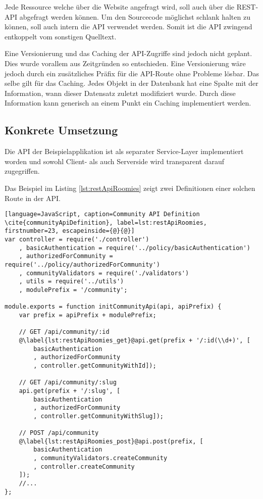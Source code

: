 Jede Ressource welche über die Website angefragt wird, soll auch über die REST-API abgefragt werden können. Um den Sourcecode möglichst schlank halten zu können, soll auch intern die API verwendet werden.
Somit ist die API zwingend entkoppelt vom sonstigen Quelltext.

Eine Versionierung und das Caching der API-Zugriffe sind jedoch nicht geplant. Dies wurde vorallem aus Zeitgründen so entschieden.
Eine Versionierung wäre jedoch durch ein zusätzliches Präfix für die API-Route ohne Probleme lösbar.
Das selbe gilt für das Caching. Jedes Objekt in der Datenbank hat eine Spalte mit der Information, wann dieser Datensatz zuletzt modifiziert wurde. Durch diese Information kann generisch an einem Punkt ein Caching implementiert werden.

\subsection*{Konkrete Umsetzung}
Die API der Beispielapplikation ist als separater Service-Layer implementiert worden und sowohl Client- als auch Serverside wird transparent darauf zugegriffen.

Das Beispiel im Listing \ref{lst:restApiRoomies} zeigt zwei Definitionen einer solchen Route in der API.

\begin{lstlisting}[language=JavaScript, caption=Community API Definition \cite{communityApiDefinition}, label=lst:restApiRoomies, firstnumber=23, escapeinside={@}{@}]
var controller = require('./controller')
	, basicAuthentication = require('../policy/basicAuthentication')
	, authorizedForCommunity = require('../policy/authorizedForCommunity')
	, communityValidators = require('./validators')
	, utils = require('../utils')
	, modulePrefix = '/community';

module.exports = function initCommunityApi(api, apiPrefix) {
	var prefix = apiPrefix + modulePrefix;

	// GET /api/community/:id
	@\label{lst:restApiRoomies_get}@api.get(prefix + '/:id(\\d+)', [
		basicAuthentication
		, authorizedForCommunity
		, controller.getCommunityWithId]);

	// GET /api/community/:slug
	api.get(prefix + '/:slug', [
		basicAuthentication
		, authorizedForCommunity
		, controller.getCommunityWithSlug]);

	// POST /api/community
	@\label{lst:restApiRoomies_post}@api.post(prefix, [
		basicAuthentication
		, communityValidators.createCommunity
		, controller.createCommunity
	]);
	//...
};
\end{lstlisting}


